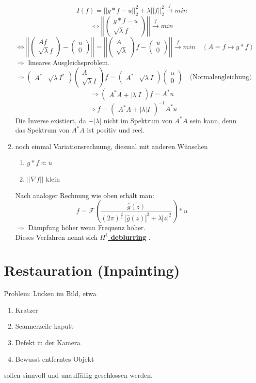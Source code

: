 \documentclass{article}
\theoremstyle{plain}
\theoremstyle{definition}
\numberwithin{equation}{section}
\newcommand{\norm}[1] {
\left|\left| #1 \right|\right|
}
\newcommand{\abs}[1] {
\left| #1 \right|
}
\newcommand{\F}[0]{
    \mathcal F
}
\newcommand{\mim}[1] {
\underline{\textbf{#1\index{#1}}}
}
\newcommand{\mat}[1] {
\begin{pmatrix} #1 \end{pmatrix}
}
\begin{document}
\begin{enumerate}[label = \arabic*. Ansatz:]
                    \[I(f) = \norm{g*f-u}_2^2 + \lambda \norm{f}_2^2 \overset{f}{\to} min\]
                    \[\iff \norm{\mat{g*f-u\\ \sqrt{\lambda} f}} \overset{f}{\to} min\]
                    \[\iff \norm{\mat{Af \\ \sqrt{\lambda}f} - \mat{u\\0}} = \norm{\mat{A \\ \sqrt{\lambda}}f - \mat{u\\0}} \overset{f}{\to} min \quad (A= f \mapsto g*f)\]
                    $\Rightarrow$ lineares Ausgleichsproblem.
                    \[\Rightarrow \mat{A^* &\sqrt{\lambda} I^*} \mat{A \\ \sqrt{\lambda}I}f = \mat{A^* & \sqrt{\lambda}I} \mat{u \\ 0} \quad \text{(Normalengleichung)}\]
                    \[\Rightarrow \mat{A^*A + \abs{\lambda}I}f=A^*u\]
                    \[\Rightarrow f= \mat{A^*A + \abs{\lambda}I}^{-1}A^*u\]
                    Die Inverse existiert, da $-\abs{\lambda}$ nicht im Spektrum von $A^*A$ sein kann, denn das Spektrum von $A^*A$ ist positiv und reel.
                    \item noch einmal Variationsrechnung, diesmal mit anderen Wünschen
                    \begin{enumerate}[label = \arabic*. Wunsch:]
                        \item $g *f \approx u$
                        \item $\norm{\nabla f}$ klein
                    \end{enumerate}
                    Nach analoger Rechnung wie oben erhält man:
                    \begin{equation}
                        f=\F \left( \frac{\overline{\hat g(z)}}{(2\pi)^\frac{d}{2} \ |\hat g(z)|^2 + \lambda |z|^2} \right) * u
                    \end{equation}
                    $\Rightarrow$ Dämpfung höher wenn Frequenz höher.\\
                    Dieses Verfahren nennt sich \mim{$H^1$ deblurring}.
                \end{enumerate}

                \section{Restauration (Inpainting)}
  Problem: Lücken im Bild, etwa

  \begin{enumerate}
    \item Kratzer
    \item Scannerzeile kaputt
    \item Defekt in der Kamera
    \item Bewusst entferntes Objekt
  \end{enumerate}
  sollen sinnvoll und unauffällig geschlossen werden.
\end{document}
